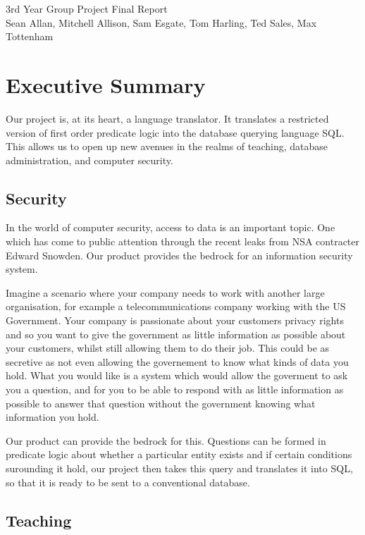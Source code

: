 \documentclass[a4paper, 11pt]{article}
\begin{document}
\begin{center}
  \huge 3rd Year Group Project Final Report \\ [0.4cm]
  \large Sean Allan, Mitchell Allison, Sam Esgate, Tom Harling, Ted Sales,
         Max Tottenham \\ [0.2cm]
  \vspace{0cm}
\end{center}

\section{Executive Summary}
  Our project is, at its heart, a language translator. It translates a
  restricted version of first order predicate logic into the database querying
  language SQL. This allows us to open up new avenues in the realms of
  teaching, database administration, and computer security.

  \subsection*{Security}
  In the world of computer security, access to data is an important topic. One
  which has come to public attention through the recent leaks from NSA
  contracter Edward Snowden. Our product provides the bedrock for an
  information security system. 

  Imagine a scenario where your company needs to work with another large
  organisation, for example a telecommunications company working with the US
  Government. Your company is passionate about your customers privacy rights
  and so you want to give the government as little information as possible
  about your customers, whilst still allowing them to do their job. This could
  be as secretive as not even allowing the governement to know what kinds of
  data you hold. What you would like is a system which would allow the
  goverment to ask you a question, and for you to be able to respond with as
  little information as possible to answer that question without the government
  knowing what information you hold.

  Our product can provide the bedrock for this. Questions can be formed in
  predicate logic about whether a particular entity exists and if certain
  conditions surounding it hold, our project then takes this query and
  translates it into SQL, so that it is ready to be sent to a conventional
  database.

  \subsection*{Teaching}
\end{document}
